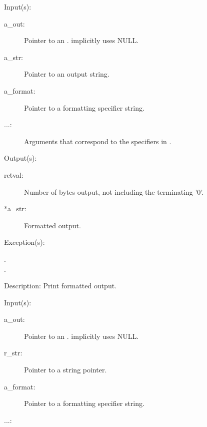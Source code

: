 \begin{capi}
	\begin{capilist}
	\item[Input(s): ]
		\begin{description}\item[]
		\item[a\_out: ]
			Pointer to an .
			 implicitly uses NULL.
		\item[a\_str: ]
			Pointer to an output string.
		\item[a\_format: ]
			Pointer to a formatting specifier string.
		\item[...: ]
			Arguments that correspond to the specifiers in
			.
		\end{description}
	\item[Output(s): ]
		\begin{description}\item[]
		\item[retval: ]
			Number of bytes output, not including the terminating
			'{\bs}0'.
		\item[*a\_str: ]
			Formatted output.
		\end{description}
	\item[Exception(s): ]
		\begin{description}\item[]
		\item[.]
		\item[.]
		\end{description}
	\item[Description: ]
		Print formatted output.
	\end{capilist}
\label{out_put_sa}
	\begin{capilist}
	\item[Input(s): ]
		\begin{description}\item[]
		\item[a\_out: ]
			Pointer to an \classname{out}.
			 implicitly uses NULL.
		\item[r\_str: ]
			Pointer to a string pointer.
		\item[a\_format: ]
			Pointer to a formatting specifier string.
		\item[...: ]

\end{description}
\end{capilist}
\end{capi}
